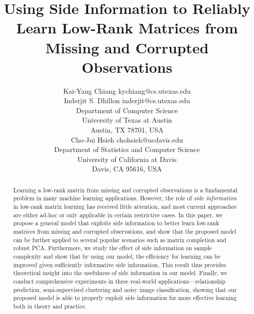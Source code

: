 \documentclass[twoside,11pt]{article}
\begin{document}
\sloppy

\title{Using Side Information to Reliably Learn Low-Rank Matrices from Missing and Corrupted Observations}
\author{\name Kai-Yang Chiang \email kychiang@cs.utexas.edu\\
  \name Inderjit S. Dhillon \email inderjit@cs.utexas.edu\\
  \addr Department of Computer Science\\
  University of Texas at Austin\\
  Austin, TX 78701, USA \\
  \name Cho-Jui Hsieh \email chohsieh@ucdavis.edu\\
  \addr Department of Statistics and Computer Science\\
  University of California at Davis\\
  Davis, CA 95616, USA
}


\maketitle

\begin{abstract}%
Learning a low-rank matrix from missing and corrupted observations is a fundamental problem
in many machine learning applications.
However,
the role of {\it side information} in low-rank matrix learning has received little attention,
and most
current approaches are either ad-hoc or only applicable in certain restrictive cases.
In this paper, we propose a general model that exploits side information to
better learn low-rank matrices from missing and corrupted observations,
and show that the proposed model can be further applied to several popular scenarios
such as matrix completion and robust PCA.
Furthermore, we study the effect of side information on sample complexity
and show that by using our model,
the efficiency for learning can be improved given sufficiently
informative side information.
This result thus provides theoretical insight into the usefulness of side information
in our model.
Finally, we conduct comprehensive experiments in three real-world applications---relationship
prediction, semi-supervised clustering and noisy image classification, showing that
our proposed model is able to properly exploit side information for more effective
learning both in theory and practice.
\end{abstract}
\end{document}
